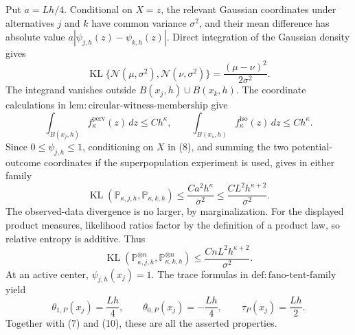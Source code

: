 Put \(a=Lh/4\). Conditional on \(X=z\), the relevant Gaussian coordinates under alternatives \(j\) and \(k\) have common variance \(\sigma^2\), and their mean difference has absolute value \(a|\psi_{j,h}(z)-\psi_{k,h}(z)|\). Direct integration of the Gaussian density gives
\[
 \operatorname{KL}\{\mathcal N(\mu,\sigma^2),\mathcal N(\nu,\sigma^2)\}
 =\frac{(\mu-\nu)^2}{2\sigma^2}. \tag{8}
\]
The integrand vanishes outside \(B(x_j,h)\cup B(x_k,h)\). The coordinate calculations in \(\mathrm{lem:circular\text{-}witness\text{-}membership}\) give
\[
 \int_{B(x_j,h)}f_{\kappa}^{\mathrm{perv}}(z)\,dz\le Ch^{\kappa},
 \qquad
 \int_{B(x_{\star},h)}f_{\kappa}^{\mathrm{iso}}(z)\,dz\le Ch^{\kappa}.
\]
Since \(0\le\psi_{j,h}\le1\), conditioning on \(X\) in (8), and summing the two potential-outcome coordinates if the superpopulation experiment is used, gives in either family
\[
 \operatorname{KL}(\mathbb P_{\kappa,j,h},\mathbb P_{\kappa,k,h})
 \le \frac{Ca^2h^{\kappa}}{\sigma^2}
 \le \frac{CL^2h^{\kappa+2}}{\sigma^2}. \tag{9}
\]
The observed-data divergence is no larger, by marginalization. For the displayed product measures, likelihood ratios factor by the definition of a product law, so relative entropy is additive. Thus
\[
 \operatorname{KL}(\mathbb P_{\kappa,j,h}^{\otimes n},
 \mathbb P_{\kappa,k,h}^{\otimes n})
 \le \frac{CnL^2h^{\kappa+2}}{\sigma^2}. \tag{10}
\]
At an active center, \(\psi_{j,h}(x_j)=1\). The trace formulas in \(\mathrm{def:fano\text{-}tent\text{-}family}\) yield
\[
 \theta_{1,P}(x_j)=\frac{Lh}{4},\qquad
 \theta_{0,P}(x_j)=-\frac{Lh}{4},\qquad
 \tau_P(x_j)=\frac{Lh}{2}.
\]
Together with (7) and (10), these are all the asserted properties.